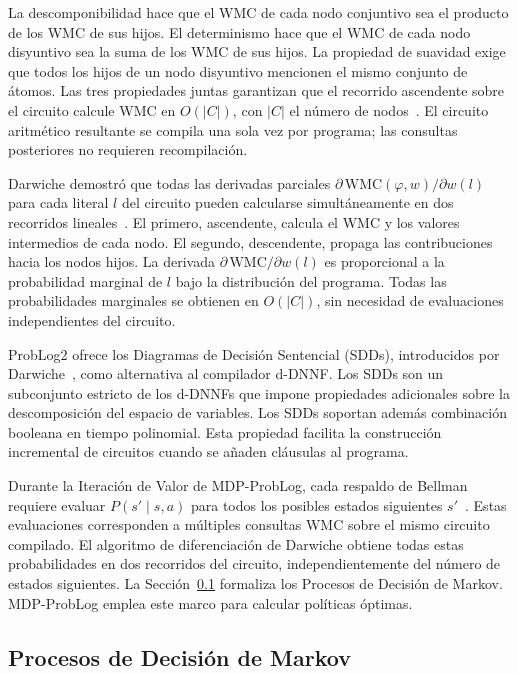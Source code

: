 La descomponibilidad hace que el WMC de cada nodo conjuntivo sea el producto de los WMC de sus hijos. El determinismo hace que el WMC de cada nodo disyuntivo sea la suma de los WMC de sus hijos. La propiedad de suavidad exige que todos los hijos de un nodo disyuntivo mencionen el mismo conjunto de átomos. Las tres propiedades juntas garantizan que el recorrido ascendente sobre el circuito calcule WMC en $O(|C|)$, con $|C|$ el número de nodos~\cite{fierens2015inference, darwiche2002knowledge}. El circuito aritmético resultante se compila una sola vez por programa; las consultas posteriores no requieren recompilación.

Darwiche demostró que todas las derivadas parciales $\partial\,\text{WMC}(\varphi, w) / \partial w(l)$ para cada literal $l$ del circuito pueden calcularse simultáneamente en dos recorridos lineales~\cite{darwiche2003differential}. El primero, ascendente, calcula el WMC y los valores intermedios de cada nodo. El segundo, descendente, propaga las contribuciones hacia los nodos hijos. La derivada $\partial\,\text{WMC} / \partial w(l)$ es proporcional a la probabilidad marginal de $l$ bajo la distribución del programa. Todas las probabilidades marginales se obtienen en $O(|C|)$, sin necesidad de evaluaciones independientes del circuito.

ProbLog2 ofrece los Diagramas de Decisión Sentencial (SDDs), introducidos por Darwiche~\cite{darwiche2011sdd}, como alternativa al compilador d-DNNF. Los SDDs son un subconjunto estricto de los d-DNNFs que impone propiedades adicionales sobre la descomposición del espacio de variables. Los SDDs soportan además combinación booleana en tiempo polinomial. Esta propiedad facilita la construcción incremental de circuitos cuando se añaden cláusulas al programa.

Durante la Iteración de Valor de MDP-ProbLog, cada respaldo de Bellman requiere evaluar $P(s' \mid s, a)$ para todos los posibles estados siguientes $s'$~\cite{bueno2016mdp}. Estas evaluaciones corresponden a múltiples consultas WMC sobre el mismo circuito compilado. El algoritmo de diferenciación de Darwiche obtiene todas estas probabilidades en dos recorridos del circuito, independientemente del número de estados siguientes. La Sección~\ref{sec:mt-mdps} formaliza los Procesos de Decisión de Markov. MDP-ProbLog emplea este marco para calcular políticas óptimas.


\subsection{Procesos de Decisión de Markov}
\label{sec:mt-mdps}

